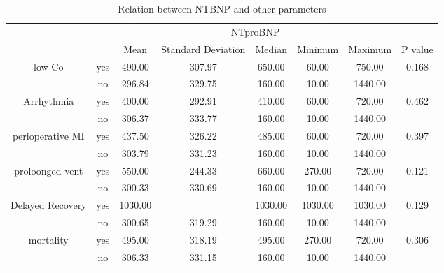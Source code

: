 \documentclass[14pt,a4paper,onecolumn]{extarticle}
\begin{document}
\begin{landscape}
\begin{table}[]
\centering
\caption{Relation between NTBNP and other parameters}
\label{Result_relation_parameters}
\begin{tabular}{cccccccc}
\hline
                                  &     & \multicolumn{5}{c}{NTproBNP}                                   &                        \\
                                  &     & Mean    & Standard Deviation & Median   & Minimum  & Maximum  & P value                \\ \hline
\multirow{2}{*}{low Co}           & yes & 490.00  & 307.97            & 650.00  & 60.00   & 750.00  & \multirow{2}{*}{0.168} \\
                                  & no  & 296.84  & 329.75            & 160.00  & 10.00   & 1440.00 &                        \\ \hline
\multirow{2}{*}{Arrhythmia}       & yes & 400.00  & 292.91            & 410.00  & 60.00   & 720.00  & \multirow{2}{*}{0.462} \\
                                  & no  & 306.37  & 333.77            & 160.00  & 10.00   & 1440.00 &                        \\ \hline
\multirow{2}{*}{perioperative MI} & yes & 437.50  & 326.22            & 485.00  & 60.00   & 720.00  & \multirow{2}{*}{0.397} \\
                                  & no  & 303.79  & 331.23            & 160.00  & 10.00   & 1440.00 &                        \\ \hline
\multirow{2}{*}{proloonged vent}  & yes & 550.00  & 244.33            & 660.00  & 270.00  & 720.00  & \multirow{2}{*}{0.121} \\
                                  & no  & 300.33  & 330.69            & 160.00  & 10.00   & 1440.00 &                        \\ \hline
\multirow{2}{*}{Delayed Recovery} & yes & 1030.00 &                   & 1030.00 & 1030.00 & 1030.00 & \multirow{2}{*}{0.129} \\
                                  & no  & 300.65  & 319.29            & 160.00  & 10.00   & 1440.00 &                        \\ \hline
\multirow{2}{*}{mortality}        & yes & 495.00  & 318.19            & 495.00  & 270.00  & 720.00  & \multirow{2}{*}{0.306} \\
                                  & no  & 306.33  & 331.15            & 160.00  & 10.00   & 1440.00 &                        \\ \hline

\end{tabular}
\end{table}
\end{landscape}
\end{document}

